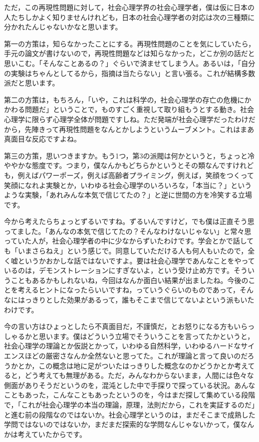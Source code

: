 \documentclass{ltjsbook}
\begin{document}
ただ，この再現性問題に対して，社会心理学界の社会心理学者，僕は仮に日本の人たちしかよく知りませんけれども，日本の社会心理学者の対応は次の三種類に分かれたんじゃないかなと思います。

第一の方策は，知らなかったことにする。再現性問題のことを気にしていたら，手元の論文が書けないので，再現性問題などは知らなかった，どこか別の話だと思いこむ。「そんなことあるの？」ぐらいで済ませてしまう人。あるいは，「自分の実験はちゃんとしてるから，指摘は当たらない」と言い張る。これが結構多数派だと思います。

第二の方策は，もちろん，「いや，これは科学の，社会心理学の存亡の危機にかかわる問題だ」ということで，ものすごく重視して取り組もうとする動き。社会心理学に限らず心理学全体が問題ですしね。ただ発端が社会心理学だったわけだから，先陣きって再現性問題をなんとかしようというムーブメント。これはまあ真面目な反応ですよね。

第三の方策，思いつきますか。もう1つ，第3の派閥は何かというと，ちょっと冷ややかな態度です。つまり，僕なんかもどちらかというとその類なんですけれども，例えばパワーポーズ，例えば高齢者プライミング，例えば，笑顔をつくって笑顔になれよ実験とか，いわゆる社会心理学のいろいろな，「本当に？」というような実験，「あれみんな本気で信じてたの？」と逆に世間の方を冷笑する立場です。

今から考えたらちょっとずるいですね。ずるいんですけど，でも僕は正直そう思ってました。「あんなの本気で信じてたの？そんなわけないじゃない」と常々思っていた人が，社会心理学者の中に少なからずいたわけです。学会とかで話しても「いまさらねえ」という感じで。同意していただける人も何人もいたので，全く嘘というかおかしな話ではないですよ。要は社会心理学であんなことをやっているのは，デモンストレーションにすぎないよ，という受け止め方です。そういうこともあるかもしれないね，今回はなんか面白い結果が出ましたね。今後のことを考えるヒントになったらいいですね，っていうぐらいのものであって，そんなにはっきりとした効果があるって，誰もそこまで信じてないよという派もいたわけです。

今の言い方はひょっとしたら不真面目だ，不謹慎だ，とお怒りになる方もいらっしゃるかと思います。僕はどういう立場でそういうことを言ってたかというと，社会心理学の理論とか仮説とかって，いわゆる自然科学，いわゆるハードなサイエンスほどの厳密さなんか全然ないと思ってた。これが理論と言って良いのだろうかとか，この概念は地に足がついたはっきりした概念なのかどうかとか考えてると，どう考えても無理がある。ただ，みんなわからないまま，人間には色々な側面がありそうだというのを，混沌とした中で手探りで探っている状況。あんなこともあった，こんなこともあったというのを，今はまだ探して集めている段階で，「これが社会心理学の本当の理論，原理，法則だから，これを実証するのだ」と進む前の段階なのではないか。社会心理学というのは，まだそこまで成熟した学問ではないのではないか，まだまだ探索的な学問なんじゃないかって，僕なんかは考えていたからです。
\end{document}
